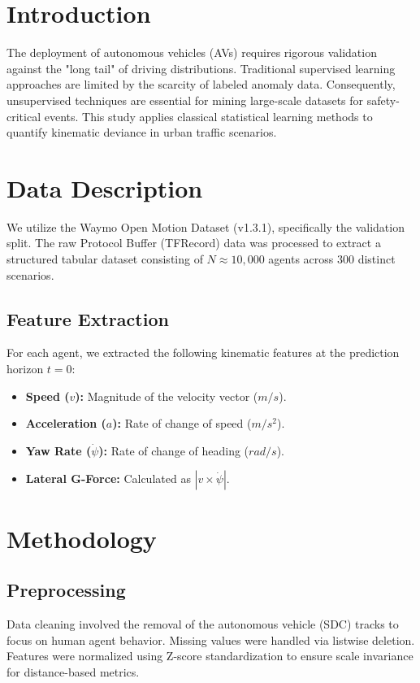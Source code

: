 \documentclass[conference]{IEEEtran}
\begin{document}
\section{Introduction}
The deployment of autonomous vehicles (AVs) requires rigorous validation against the "long tail" of driving distributions. Traditional supervised learning approaches are limited by the scarcity of labeled anomaly data. Consequently, unsupervised techniques are essential for mining large-scale datasets for safety-critical events. This study applies classical statistical learning methods to quantify kinematic deviance in urban traffic scenarios.

\section{Data Description}
We utilize the Waymo Open Motion Dataset (v1.3.1), specifically the validation split. The raw Protocol Buffer (TFRecord) data was processed to extract a structured tabular dataset consisting of $N \approx 10,000$ agents across 300 distinct scenarios.

\subsection{Feature Extraction}
For each agent, we extracted the following kinematic features at the prediction horizon $t=0$:
\begin{itemize}
    \item \textbf{Speed ($v$):} Magnitude of the velocity vector ($m/s$).
    \item \textbf{Acceleration ($a$):} Rate of change of speed ($m/s^2$).
    \item \textbf{Yaw Rate ($\dot{\psi}$):} Rate of change of heading ($rad/s$).
    \item \textbf{Lateral G-Force:} Calculated as $|v \times \dot{\psi}|$.
\end{itemize}

\section{Methodology}

\subsection{Preprocessing}
Data cleaning involved the removal of the autonomous vehicle (SDC) tracks to focus on human agent behavior. Missing values were handled via listwise deletion. Features were normalized using Z-score standardization to ensure scale invariance for distance-based metrics.
\end{document}

